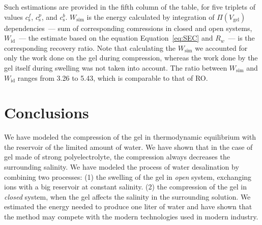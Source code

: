 \documentclass[journal,article,submit,pdftex,moreauthors]{Definitions/mdpi}
\newcommand{\cs}{c_{\mathrm{s}}}
\newcommand{\Vgel}{V_\mathrm{gel}}
\newcommand{\Pgel}{\Pi}
\newcommand{\refeq}[1]{Equation~\ref{#1}{}}
\begin{document}
Such estimations are provided in the fifth column of the table, for five triplets of values $\cs^f$, $\cs^p$, and $\cs^b$.
$W_{\mathrm{sim}}$ is the energy calculated by integration of $\Pgel(\Vgel)$ dependencies~--- sum of corresponding comressions in closed and open systems, $W_{\mathrm{id}}$~--- the estimate based on the equation \refeq{eq:SEC} and $R_w$~--- is the corresponding recovery ratio.
Note that calculating the $W_{\mathrm{sim}}$ we accounted for only the work done on the gel during compression, whereas the work done by the gel itself during swelling was not taken into account.
The ratio between $W_{\mathrm{sim}}$ and $W_{\mathrm{id}}$ ranges from 3.26 to 5.43, which is comparable to that of RO.


\section{Conclusions}
We have modeled the compression of the gel in thermodynamic equilibrium with the reservoir of the limited amount of water.
We have shown that in the case of gel made of strong polyelectrolyte, the compression always decreases the surrounding salinity.
We have modeled the process of water desalination by combining two processes: 
(1) the swelling of the gel in \emph{open} system, exchanging ions with a big reservoir at constant salinity. 
(2) the compression of the gel in \emph{closed} system, when the gel affects the salinity in the surrounding solution.
We estimated the energy needed to produce one liter of water and have shown that the method may compete with the modern technologies used in modern industry.










\vspace{6pt} 


\end{document}
